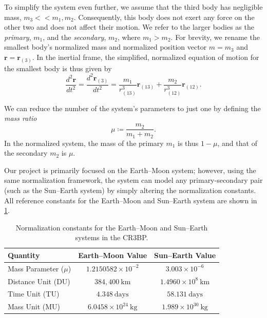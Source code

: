 To simplify the system even further, we assume that the third body has negligible mass, $m_3 << m_1,m_2$. Consequently, this body does not exert any force on the other two and does not affect their motion. We refer to the larger bodies as the \emph{primary}, $m_1$, and the \emph{secondary}, $m_2$, where $m_1>m_2$. For brevity, we rename the smallest body's normalized mass and normalized position vector $m = m_3$ and $\boldsymbol{r} = \boldsymbol{r}_{(3)}$. In the inertial frame, the simplified, normalized equation of motion for the smallest body is thus given by
\begin{equation} \label{eq:inertial_kinematiks}
    \frac{d^2\boldsymbol{r}}{dt^2} =\frac{d^2\boldsymbol{r}_{(3)}}{dt^2}
    = \frac{m_1}{r_{(13)}^3}\boldsymbol{r}_{(13)}
    + \frac{m_2}{r_{(12)}^3}\boldsymbol{r}_{(12)}.
\end{equation}

We can reduce the number of the system's parameters to just one by defining the \emph{mass ratio} 
\begin{equation} \label{eq:mass ratio}
    \mu \coloneq \frac{m_2}{m_1+m_2}.
\end{equation}
In the normalized system, the mass of the primary $m_1$ is thus $1-\mu$, and that of the secondary $m_2$ is $\mu$.

Our project is primarily focused on the Earth--Moon system; however, using the same normalization framework, the system can model any primary-secondary pair (such as the Sun--Earth system) by simply altering the normalization constants. All reference constants for the Earth--Moon and Sun--Earth system are shown in \cref{tab:cr3bp_parameters}. 

\begin{table}[htpb]
    \centering
    \caption{Normalization constants for the Earth--Moon and Sun--Earth systems in the CR3BP.}
    \label{tab:cr3bp_parameters}
    \begin{tabular}{l c c}
        \hline
        Quantity & Earth--Moon Value & Sun--Earth Value \\
        \hline
        Mass Parameter ($\mu$) & $1.2150582 \times 10^{-2}$             & $3.003 \times 10^{-6}$ \\
        Distance Unit (DU)     & $384,400~\mathrm{km}$    & $1.4960 \times 10^8~\mathrm{km}$\\
        Time Unit (TU)         & $4.348~\mathrm{days}$     & $58.131~\mathrm{days}$ \\
        Mass Unit (MU)         & $6.0458 \times 10^{24}~\mathrm{kg}$ & $1.989 \times 10^{30}~\mathrm{kg}$ \\
        \hline
    \end{tabular}
\end{table}

